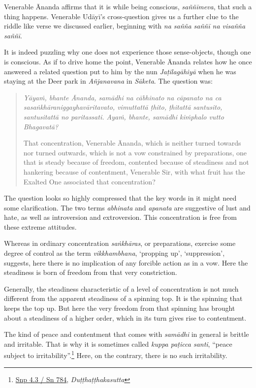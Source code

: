 Venerable Ānanda affirms that it is while being conscious, \emph{saññīmeva}, that such a thing happens. Venerable Udāyī's cross-question gives us a further clue to the riddle like verse we discussed earlier, beginning with \emph{na sañña saññī na visañña saññī}.

It is indeed puzzling why one does not experience those sense-objects, though one is conscious. As if to drive home the point, Venerable Ānanda relates how he once answered a related question put to him by the nun \emph{Jaṭilagāhiyā} when he was staying at the Deer park in \emph{Añjanavana} in \emph{Sāketa}. The question was:

\begin{quote}
\emph{Yāyaṁ, bhante Ānanda, samādhi na cābhinato na cāpanato na ca sasaṅkhāraniggayhavāritavato, vimuttattā ṭhito, ṭhitattā santusito, santusitattā no paritassati. Ayaṁ, bhante, samādhi kiṁphalo vutto Bhagavatā?}

That concentration, Venerable Ānanda, which is neither turned towards nor turned outwards, which is not a vow constrained by preparations, one that is steady because of freedom, contented because of steadiness and not hankering because of contentment, Venerable Sir, with what fruit has the Exalted One associated that concentration?
\end{quote}

The question looks so highly compressed that the key words in it might need some clarification. The two terms \emph{abhinata} and \emph{apanata} are suggestive of lust and hate, as well as introversion and extroversion. This concentration is free from these extreme attitudes.

Whereas in ordinary concentration \emph{saṅkhāras}, or preparations, exercise some degree of control as the term \emph{vikkhambhana}, `propping up', `suppression', suggests, here there is no implication of any forcible action as in a vow. Here the steadiness is born of freedom from that very constriction.

Generally, the steadiness characteristic of a level of concentration is not much different from the apparent steadiness of a spinning top. It is the spinning that keeps the top up. But here the very freedom from that spinning has brought about a steadiness of a higher order, which in its turn gives rise to contentment.

The kind of peace and contentment that comes with \emph{samādhi} in general is brittle and irritable. That is why it is sometimes called \emph{kuppa paṭicca santi}, ``peace subject to irritability''.\footnote{\href{https://suttacentral.net/snp4.3/pli/ms}{Snp 4.3 / Sn 784}, \emph{Duṭṭhaṭṭhakasutta}} Here, on the contrary, there is no such irritability.

